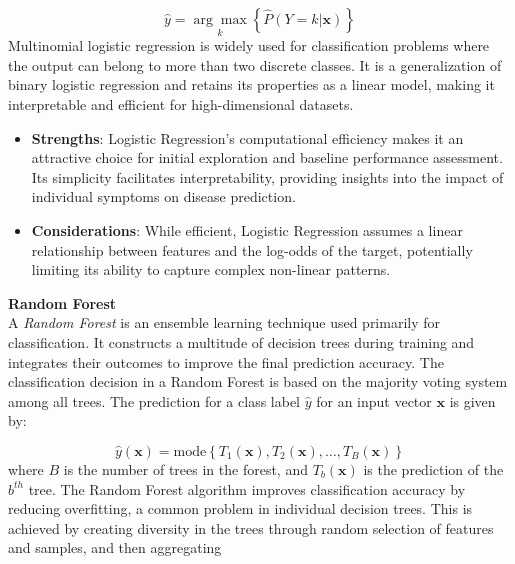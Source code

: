 \begin{equation}
    \hat{y} = \underset{k}{\arg\max} \left\{ \hat{P}(Y = k | \mathbf{x}) \right\}
\end{equation}
\noindent
Multinomial logistic regression is widely used for classification problems where the output can belong to more than two discrete classes. It is a generalization of binary logistic regression and retains its properties as a linear model, making it interpretable and efficient for high-dimensional datasets.

\begin{itemize}
	\item \textbf{Strengths}: Logistic Regression's computational efficiency makes it an attractive choice for initial exploration and
	      baseline performance assessment. Its simplicity facilitates interpretability, providing insights into the impact of individual symptoms on disease prediction.
	\item \textbf{Considerations}: While efficient, Logistic Regression assumes a linear relationship between features and the
	      log-odds of the target, potentially limiting its ability to capture complex non-linear patterns.
\end{itemize}
\vspace{0.3cm}

\noindent
\textbf{Random Forest}\vspace{0.15cm}\\
A \textit{Random Forest} is an ensemble learning technique used primarily for classification. It constructs a multitude of decision trees during training and integrates their outcomes to improve the final prediction accuracy. The classification decision in a Random Forest is based on the majority voting system among all trees. 
The prediction for a class label $\hat{y}$ for an input vector $\mathbf{x}$ is given by:

\begin{equation}
\hat{y}(\mathbf{x}) = \text{mode} \left\{ T_1(\mathbf{x}), T_2(\mathbf{x}), \ldots, T_B(\mathbf{x}) \right\}
\end{equation}
\noindent
where $B$ is the number of trees in the forest, and $T_b(\mathbf{x})$ is the prediction of the $b^{th}$ tree.
\noindent
The Random Forest algorithm improves classification accuracy by reducing overfitting, a common problem in individual decision trees. This is achieved by creating diversity in the trees through random selection of features and samples, and then aggregating

